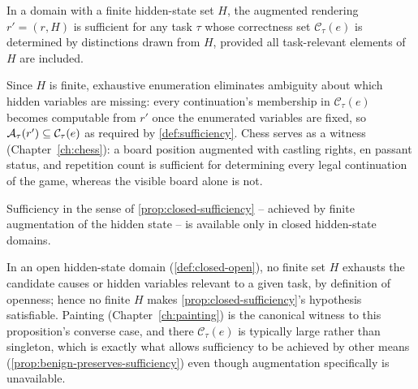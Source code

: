 \begin{proposition}
\label{prop:closed-sufficiency}
In a domain with a finite hidden-state set $H$, the augmented rendering
$r' = (r, H)$ is sufficient for any task $\tau$ whose correctness set
$\mathcal{C}_\tau(e)$ is determined by distinctions drawn from $H$,
provided all task-relevant elements of $H$ are included.
\end{proposition}

\begin{proofsketch}
Since $H$ is finite, exhaustive enumeration eliminates ambiguity about
which hidden variables are missing: every continuation's membership in
$\mathcal{C}_\tau(e)$ becomes computable from $r'$ once the enumerated
variables are fixed, so $\mathcal{A}_{\tau}(r') \subseteq \mathcal{C}_\tau(e)$
as required by \cref{def:sufficiency}. Chess serves as a witness
(Chapter~\ref{ch:chess}): a board position augmented with castling rights,
en passant status, and repetition count is sufficient for determining
every legal continuation of the game, whereas the visible board alone is
not.
\end{proofsketch}

\begin{proposition}
\label{prop:sufficiency-closed-only}
Sufficiency in the sense of \cref{prop:closed-sufficiency} -- achieved by
finite augmentation of the hidden state -- is available only in closed
hidden-state domains.
\end{proposition}

\begin{proofsketch}
In an open hidden-state domain (\cref{def:closed-open}), no finite set $H$
exhausts the candidate causes or hidden variables relevant to a given
task, by definition of openness; hence no finite $H$ makes
\cref{prop:closed-sufficiency}'s hypothesis satisfiable. Painting
(Chapter~\ref{ch:painting}) is the canonical witness to this proposition's
converse case, and there $\mathcal{C}_\tau(e)$ is typically large rather
than singleton, which is exactly what allows sufficiency to be achieved by
other means (\cref{prop:benign-preserves-sufficiency}) even though
augmentation specifically is unavailable.
\end{proofsketch}

